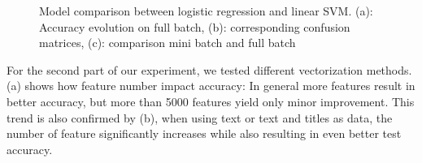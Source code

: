 \documentclass[10pt]{article}
\begin{document}
\begin{figure}[htbp]
\begin{subfigure}[t]{\textwidth}
	\end{subfigure}
	
	\caption{Model comparison between logistic regression and linear SVM. (a): Accuracy evolution on full batch, (b): corresponding confusion matrices, (c): comparison mini batch and full batch}
	\label{Fig 1}
\end{figure}

	
	For the second part of our experiment, we tested different vectorization methods. (a) shows how feature number impact accuracy: In general more features result in better accuracy, but more than 5000 features yield only minor improvement. This trend is also confirmed by (b), when using text or text and titles as data, the number of feature significantly increases while also resulting in even better test accuracy.\\
\end{document}
